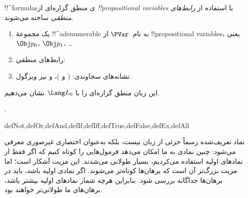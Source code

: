 \documentclass[../../../include/open-logic-section]{subfiles}
\begin{document}


!!^{formula}sی منطق گزاره‌ای از
\emph{!!{propositional
    variable}s} با استفاده از \emph{رابط‌های منطقی} ساخته می‌شوند.

\begin{enumerate}
\item یک مجموعهٔ !!^a{denumerable} به نام~$\PVar$ از
  !!{propositional variable}s، یعنی $\Obj p_0$،
  $\Obj p_1$، \dots
{}
\item رابط‌های منطقی:
  \startycommalist
\item نشانه‌های سجاوندی: ( و )، و نیز ویرگول.
\end{enumerate}

این زبان منطق گزاره‌ای را با $\Lang L_0$ نشان می‌دهیم.

.

\begin{tagblock}{defNot,defOr,defAnd,defIf,defIff,defTrue,defFalse,defEx,defAll}
\begin{explain}
نماد تعریف‌شده رسماً جزئی از زبان نیست، بلکه به‌عنوان اختصاری غیرصوری
معرفی می‌شود: چنین نمادی به ما امکان می‌دهد فرمول‌هایی را کوتاه کنیم که
اگر فقط از نمادهای اولیه استفاده می‌کردیم، بسیار طولانی می‌شدند. این مزیت
آشکار است؛ اما مزیت بزرگ‌تر آن است که برهان‌ها کوتاه‌تر می‌شوند. اگر نمادی
اولیه باشد، باید در برهان‌ها جداگانه بررسی شود. بنابراین هرچه شمار نمادهای
اولیه بیشتر باشد، برهان‌های ما طولانی‌تر خواهند بود.
\end{explain}
\end{tagblock}
\end{document}
